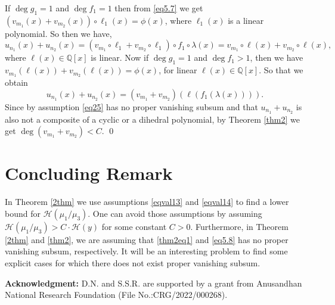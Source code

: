 \documentclass[12pt]{amsart}
\newcommand{\Q}{\mbox{$\mathbb Q$}}
\begin{document}
	If $\deg g_1=1$ and $\deg f_1=1$ then from \eqref{eq5.7} we get $(v_{m_1}(x)+v_{m_2}(x))\circ \ell_1(x)=\phi(x)$, where $\ell_1(x)$ is a linear polynomial. So then we have, 
    \begin{equation*}
        u_{n_1}(x)+u_{n_2}(x)=(v_{m_1}\circ \ell_1+v_{m_2}\circ \ell_1)\circ f_1 \circ \lambda (x) = v_{m_1}\circ \ell (x)+ v_{m_2}\circ \ell(x),
    \end{equation*} where $\ell(x)\in \Q[x]$ is linear. Now if $\deg g_1=1$ and $\deg f_1>1$, then we have $v_{m_1}(\ell(x))+v_{m_2}(\ell(x))=\phi(x)$, for linear $\ell(x)\in \Q[x]$. So that we obtain 
    \begin{equation}\label{eq25}
        u_{n_1}(x)+u_{n_2}(x)=(v_{m_1}+v_{m_2})(\ell(f_1(\lambda(x)))).
    \end{equation} Since by assumption \eqref{eq25} has no proper vanishing subsum and that $u_{n_1}+u_{n_2}$ is also not a composite of a cyclic or a dihedral polynomial, by Theorem \ref{thm2} we get $\deg (v_{m_1}+v_{m_2})<C$.
    \qed
\section{Concluding Remark}
   In Theorem \ref{2thm} we use assumptions \eqref{eqval13} and \eqref{eqval14} to find a lower bound for $\mathcal{H}(\mu_1/\mu_3)$. One can avoid those assumptions by assuming $\mathcal{H}(\mu_1/\mu_3) > C\cdot \mathcal{H}(y)$ for some constant $C>0$. Furthermore, in Theorem \ref{2thm} and \ref{thm2}, we are assuming that \eqref{thm2eq1} and \eqref{eq5.8} has no proper vanishing subsum, respectively. It will be an interesting problem to find some explicit cases for which there does not exist proper vanishing subsum. 	

{\bf Acknowledgment:} D.N. and S.S.R. are supported by a grant from Anusandhan National Research Foundation (File No.:CRG/2022/000268).
	
\end{document}
